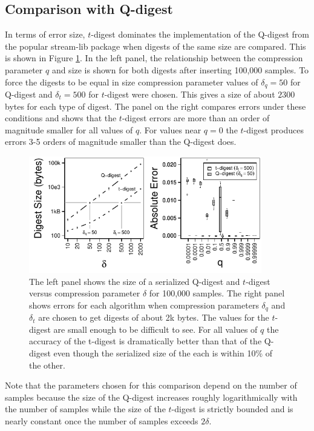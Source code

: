 \documentclass[11pt]{amsart}
\begin{document}
\subsection{Comparison with Q-digest}
In terms of error size, $t$-digest dominates the implementation of the Q-digest\cite{qdigest} from the popular stream-lib package \cite{github:stream} when digests of the same size are compared.  This is shown in Figure \ref{fig:qd-comparison}.  In the left panel, the relationship between the compression parameter $q$ and size is shown for both digests after inserting 100,000 samples.  To force the digests to be equal in size compression parameter values of $\delta_q=50$ for Q-digest  and $\delta_t = 500$ for $t$-digest were chosen. This gives a  size of about $2300$ bytes for each type of digest. The panel on the right compares errors under these conditions and shows that the $t$-digest errors are more than an order of magnitude smaller for all values of $q$. For values near $q=0$ the $t$-digest produces errors 3-5 orders of magnitude smaller than the Q-digest does.
\begin{figure}[htb] %
   \centering
   \includegraphics[width=4in]{qd-sizes.pdf} 
   \caption{The left panel shows the size of a serialized Q-digest and $t$-digest versus compression parameter $\delta$ for 100,000 samples. The right panel shows errors for each algorithm when compression parameters $\delta_q$ and $\delta_t$ are chosen to get digests of about 2k bytes.  The values for the $t$-digest are small enough to be difficult to see. For all values of $q$ the accuracy of the t-digest is dramatically better than that of the Q-digest even though the serialized size of the each is within 10\% of the other. }
   \label{fig:qd-comparison}
\end{figure}
Note that the parameters chosen for this comparison depend on the number of samples because the size of the Q-digest increases roughly logarithmically with the number of samples while the size of the $t$-digest is strictly bounded and is nearly constant once the number of samples exceeds $2 \delta$. 
\end{document}
